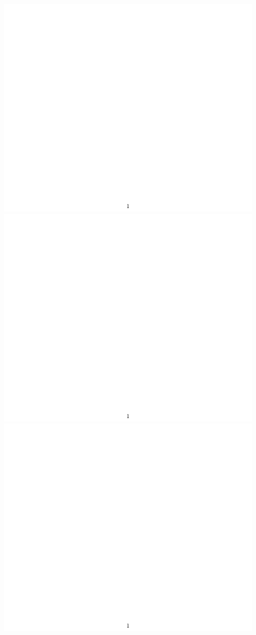\documentclass{article}
\begin{document}
\includegraphics[page=4]{Fighter.pdf}
\includegraphics[page=5]{Fighter.pdf}
\includegraphics[page=6]{Fighter.pdf}
\end{document}
